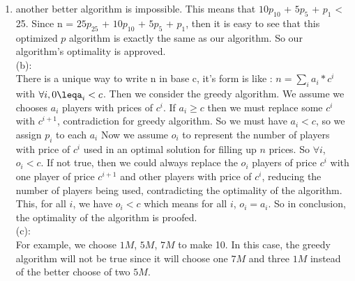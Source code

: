 \documentclass[12pt,a4paper]{article}
\makeatletter
\newtheorem*{solution}{Solution}
\theoremstyle{definition}
\renewenvironment{solution}[1][Solution] {\par\pushQED{\qed}\normalfont\topsep6\p@\@plus6\p@\relax\trivlist\item[\hskip\labelsep\bfseries#1\@addpunct{.}]\ignorespaces}{\popQED\endtrivlist\@endpefalse} \makeatother
\makeatother
\begin{document}
\begin{enumerate}
\begin{solution}
        another better algorithm is impossible.
        This means that $10p_{10}$ + $5p_{5}$ + $p_{1}$ < 25. Since
        n = $25p_{25}$ + $10p_{10}$ + $5p_{5}$ + $p_{1}$, then it is easy to see that this optimized
         $p$ algorithm is exactly the same as our algorithm. So our algorithm's optimality is approved.
         \\
         (b):\\
         There is a unique way to write n in base c, it's form is like :
         $n = \sum_{i} a_i * c^i$ with $ \forall i, 0\leqa_i<c $.
         Then we consider the greedy algorithm. We assume we chooses $a_i$ players with prices of $c^i$. If $a_i \ge c$ then we must replace some $c^i$ with $c^{i+1}$, contradiction for greedy algorithm. So we must have $a_i < c$, so we assign $p_i$ to each $a_i$
         Now we assume $o_i$ to represent the number of players with price of $c^i$ used in an optimal solution for filling up $n$ prices. So $\forall i$, $o_i < c$. If not true, then we could always replace
         the $o_i$ players of price $c^i$ with one player of price $c^{i+1}$ and other players with price of $c^i$, reducing the number of players being used, contradicting the optimality of the algorithm. 
         This, for all $i$, we have $o_i < c$ which means for all $i$, $o_i = a_i$. So in conclusion, the optimality of the algorithm is proofed.
         \\
         (c):\\
         For example, we choose $1M$, $5M$, $7M$ to make 10. In this case, the greedy algorithm will not be true since it will choose one $7M$ and three $1M$ instead of the better choose of two $5M$. 
         

    \end{solution}
	

\end{enumerate}
\end{document}

